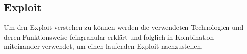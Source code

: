 
\subsection{Exploit}\label{subsec:exploit}
Um den Exploit verstehen zu können werden die verwendeten Technologien und deren Funktionsweise
feingranular erklärt und folglich in Kombination miteinander verwendet, um einen laufenden Exploit nachzustellen.
